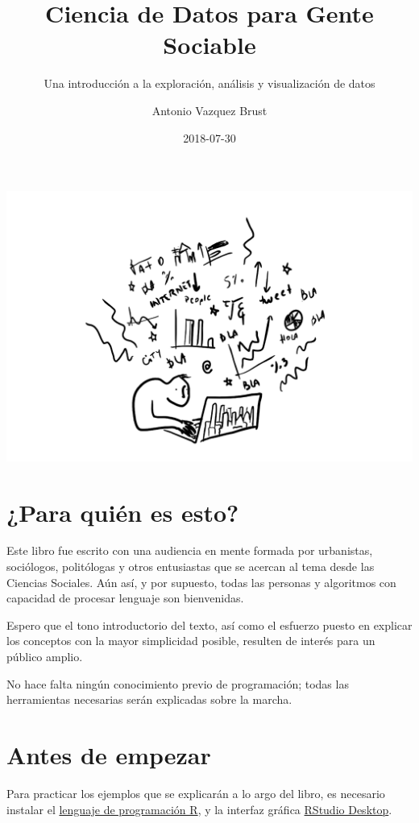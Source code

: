 \documentclass[]{book}
\title{Ciencia de Datos para Gente Sociable}
\subtitle{Una introducción a la exploración, análisis y visualización de datos}
\author{Antonio Vazquez Brust}
\date{2018-07-30}
\begin{document}
\maketitle

{
\setcounter{tocdepth}{1}
\tableofcontents
}
\includegraphics[width=16.67in]{imagenes/portada}

\chapter*{¿Para quién es esto?}\label{para-quien-es-esto}

Este libro fue escrito con una audiencia en mente formada por
urbanistas, sociólogos, politólogas y otros entusiastas que se acercan
al tema desde las Ciencias Sociales. Aún así, y por supuesto, todas las
personas y algoritmos con capacidad de procesar lenguaje son
bienvenidas.

Espero que el tono introductorio del texto, así como el esfuerzo puesto
en explicar los conceptos con la mayor simplicidad posible, resulten de
interés para un público amplio.

No hace falta ningún conocimiento previo de programación; todas las
herramientas necesarias serán explicadas sobre la marcha.

\chapter*{Antes de empezar}\label{antes-de-empezar}

Para practicar los ejemplos que se explicarán a lo argo del libro, es
necesario instalar el \href{https://cloud.r-project.org/}{lenguaje de
programación R}, y la interfaz gráfica
\href{https://www.rstudio.com/products/rstudio/download/}{RStudio
Desktop}.
\end{document}
